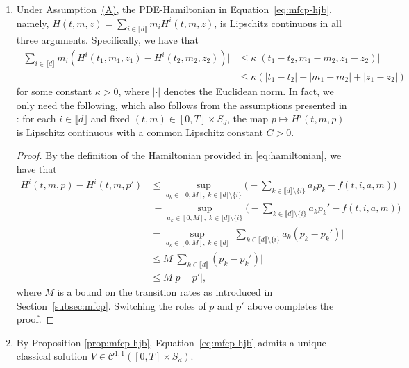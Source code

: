 \documentclass[11pt,reqno]{amsart}
\numberwithin{equation}{section}
\theoremstyle{plain}
\newcommand{\sC}{\mathcal{C}}
\newcommand{\lbrs}[1]{\llbracket #1 \rrbracket}
\begin{document}
\begin{enumerate}
\item[(1)] Under Assumption~\hyperref[a:mfcp-A]{(A)}, the PDE-Hamiltonian in Equation~\eqref{eq:mfcp-hjb}, namely, $H(t, m, z)=\sum_{i \in \lbrs{d}} m_i H^i(t, m, z)$, is Lipschitz continuous in all three arguments. Specifically, we have that
\begin{align*}
    \Big|\sum_{i \in \lbrs{d}} m_i(H^i(t_1, m_1, z_1) - H^i(t_2, m_2, z_2))\Big| &\leq \kappa|(t_1 - t_2, m_1 - m_2, z_1 - z_2)| \\
    &\leq \kappa(|t_1 - t_2| + |m_1 - m_2| + |z_1 - z_2|)
\end{align*}
for some constant $\kappa > 0$, where $|\cdot|$ denotes the Euclidean norm. In fact, we only need the following, which also follows from the assumptions presented in \cite{mfcp}: for each $i \in \lbrs{d}$ and fixed $(t,m) \in [0,T] \times S_d$, the map $p \mapsto H^i(t, m, p)$ is Lipschitz continuous with a common Lipschitz constant $C > 0$.
\begin{proof}
By the definition of the Hamiltonian provided in \eqref{eq:hamiltonian}, we have that
\begin{align*}
    H^i(t, m, p) - H^i(t, m, p') &\leq \sup_{a_k \in [0, M], \;k\in\lbrs{d}\setminus\{i\}} \Big(-\sum_{k\in\lbrs{d}\setminus\{i\}}a_k p_k - f(t,i,a,m)\Big) \\
    & \ - \sup_{a_k \in [0, M], \;k\in\lbrs{d}\setminus\{i\}} \Big(-\sum_{k\in\lbrs{d}\setminus\{i\}}a_k p_k' - f(t,i,a,m)\Big) \\
    &= \sup_{a_k \in [0, M], \;k\in\lbrs{d}} \Big|\sum_{k\in\lbrs{d}\setminus\{i\}}a_k (p_k - p_k')\Big| \\
    &\leq M \Big|\sum_{k\in\lbrs{d}}(p_k - p_k')\Big| \\
    &\leq M |p - p'|,
\end{align*}
where $M$ is a bound on the transition rates as introduced in Section~\ref{subsec:mfcp}.  
Switching the roles of $p$ and $p'$ above completes the proof.
\end{proof}
\item[(2)] By Proposition \ref{prop:mfcp-hjb}, Equation~\eqref{eq:mfcp-hjb} admits a unique classical solution $V \in \sC^{1,1}([0,T] \times S_d)$.
\end{enumerate}
\end{document}
